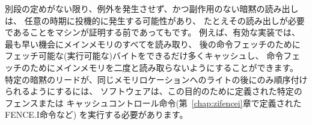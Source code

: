 \begin{comment}
Except when specified otherwise, implicit reads that do not raise an
exception and that have no side effects
may occur arbitrarily early and speculatively, even before the machine could
possibly prove that the read will be needed.  For instance, a valid
implementation could attempt to read all of main memory at the earliest
opportunity, cache as many fetchable (executable) bytes as possible for later
instruction fetches, and avoid reading main memory for instruction fetches ever
again.  To ensure that certain implicit reads are ordered only after writes to
the same memory locations, software must execute specific fence or cache-control
instructions defined for this purpose (such as the FENCE.I instruction
defined in Chapter~\ref{chap:zifencei}).
\end{comment}

別段の定めがない限り、例外を発生させず、かつ副作用のない暗黙の読み出しは、
任意の時期に投機的に発生する可能性があり、
たとえその読み出しが必要であることをマシンが証明する前であってもです。 例えば、有効な実装では、最も早い機会にメインメモリのすべてを読み取り、
後の命令フェッチのためにフェッチ可能な(実行可能な)バイトをできるだけ多くキャッシュし、
命令フェッチのためにメインメモリを二度と読み取らないようにすることができます。
特定の暗黙のリードが、同じメモリロケーションへのライトの後にのみ順序付けられるようにするには、
ソフトウェアは、この目的のために定義された特定のフェンスまたは
キャッシュコントロール命令(第~\ref{chap:zifencei}章で定義されたFENCE.I命令など)
を実行する必要があります。

\begin{comment}
The memory accesses (implicit or explicit) made by a hart may appear to occur
in a different order as perceived by another hart or by any other agent that
can access the same memory.  This perceived reordering of memory accesses is
always constrained, however, by the applicable memory consistency model.  The
default memory consistency model for RISC-V is the RISC-V Weak Memory Ordering
(RVWMO), defined in Chapter~\ref{ch:memorymodel} and in appendices.
Optionally, an implementation may adopt the stronger model of Total Store
Ordering, as defined in Chapter~\ref{sec:ztso}.  The execution environment may
also add constraints that further limit the perceived reordering of memory
accesses.
Since the RVWMO model is the weakest model allowed for any RISC-V
implementation, software written for this model is compatible with the
actual memory consistency rules of all RISC-V implementations.  As with
implicit reads, software must execute fence or cache-control instructions to
ensure specific ordering of memory accesses beyond the requirements of the
assumed memory consistency model and execution environment.
\end{comment}


